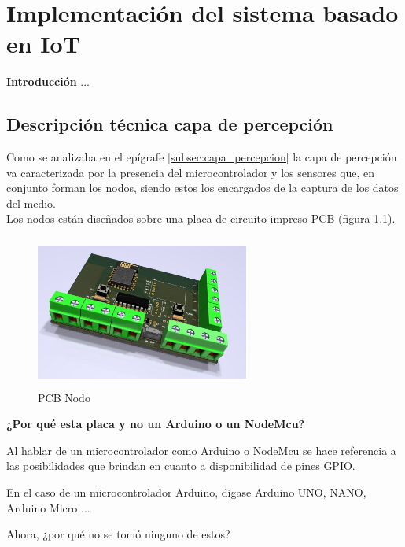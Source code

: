 \chapter{Implementación del sistema basado en IoT}\label{cap: }

        \textbf{\Large Introducción}\newline
        ...

\section{Descripción técnica capa de percepción}

Como se analizaba en el epígrafe \ref{subsec:capa_percepcion} la capa de percepción va caracterizada por la presencia del microcontrolador y los sensores que, en conjunto forman los nodos, siendo estos los
encargados de la captura de los datos del medio.\\

Los nodos están diseñados sobre una placa de circuito impreso PCB (figura \ref{imag:pcb_nodo}).

\begin{figure}[H]
    \centering
    \includegraphics[width=7cm, height=5cm]{imagenes/vista 3D.jpg}
    \caption{PCB Nodo}
    \label{imag:pcb_nodo}
\end{figure}

\textbf{¿Por qué esta placa y no un Arduino o un NodeMcu?}

Al hablar de un microcontrolador como Arduino o NodeMcu se hace referencia a las posibilidades que brindan en cuanto a disponibilidad de pines GPIO. 

En el caso de un microcontrolador Arduino, dígase Arduino UNO, NANO, Arduino Micro ... 

Ahora, ¿por qué no se tomó ninguno de estos?

